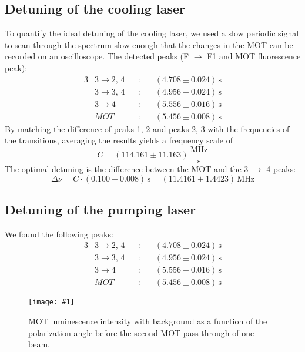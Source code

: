 \documentclass[twocolumn]{article}
\newcommand{\insertFigure}[1]{%
   \texttt{[image: \#1]}%
}
\begin{document}
\subsection{Detuning of the cooling laser}
To quantify the ideal detuning of the cooling laser, we used a slow periodic signal to scan through the spectrum slow enough that the changes in the MOT can be recorded on an oscilloscope. The detected peaks (F $\rightarrow$ F1 and MOT fluorescence peak):
\begin{alignat*}{3}
&3 \rightarrow 2, \, 4&&: \hspace{12pt} &(4.708 \pm 0.024) \, \text{s}\\
&3 \rightarrow 3, \, 4&&:  &(4.956 \pm 0.024) \, \text{s}\\
&3 \rightarrow 4&&:		 &(5.556 \pm 0.016)\, \text{s}\\
&MOT			&&:		&(5.456 \pm 0.008) \, \text{s}
\end{alignat*}
By matching the difference of peaks 1, 2 and peaks 2, 3 with the frequencies of the transitions, averaging the results yields a frequency scale of
\begin{equation}
C =(114.161 \pm 11.163)\, \frac{\text{MHz}}{\text{s}} \nonumber
\end{equation}
The optimal detuning is the difference between the MOT and the 3 $\rightarrow$ 4 peaks:
\begin{equation}\label{eqn:detuning}
\Delta \nu = C \cdot (0.100 \pm 0.008) \, \text{s} = (11.4161 \pm 1.4423) \, \text{MHz}
\end{equation}
\subsection{Detuning of the pumping laser}
We found the following peaks:
\begin{alignat*}{3}
&3 \rightarrow 2, \, 4&&: \hspace{12pt} &(4.708 \pm 0.024) \, \text{s}\\
&3 \rightarrow 3, \, 4&&:  &(4.956 \pm 0.024) \, \text{s}\\
&3 \rightarrow 4&&:		 &(5.556 \pm 0.016)\, \text{s}\\
&MOT			&&:		&(5.456 \pm 0.008) \, \text{s}
\end{alignat*}
\begin{figure}
\centering
\insertFigure{Images/Detuning_cooling.png}
\caption{MOT luminescence intensity with background as a function of the polarization angle before the second MOT pass-through of one beam.}
\label{fig:Detuning}
\end{figure}
\end{document}
